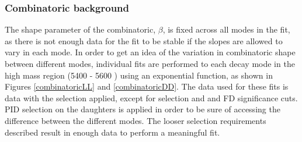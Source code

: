\begin{table}[h]
\centering
{}
\caption{Summary of systematic uncertainties associated with the signal shape.}
\label{signalshapeSystematics}
\end{table}

\subsubsection{Combinatoric background}

The shape parameter of the combinatoric, $\beta$, is fixed across all \Dz modes in the \CP fit, as there is not enough data for the fit to be stable if the slopes are allowed to vary in each mode. In order to get an idea of the variation in combinatoric shape between different \Dz modes, individual fits are performed to each \Dz decay mode in the high \Bm mass region (5400 - 5600 \mevcc) using an exponential function, as shown in Figures \ref{combinatoricLL} and \ref{combinatoricDD}. The data used for these fits is \runone data with the selection applied, except for \Kstar selection and \Dz and \KS FD significance cuts. PID selection on the \Dz daughters is applied in order to be sure of accessing the difference between the different \Dz modes. The looser selection requirements described result in enough data to perform a meaningful fit.


